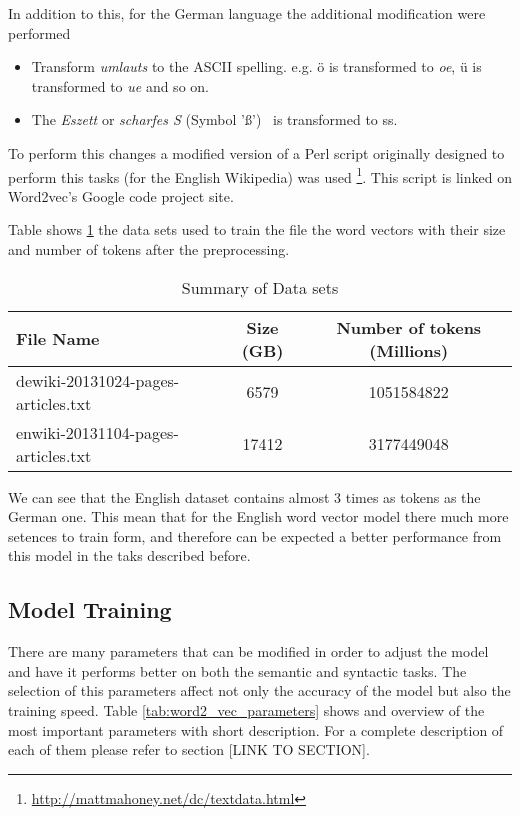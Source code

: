 In addition to this, for the German language the additional modification were
performed
\begin{itemize}
\item Transform \textit{umlauts} to the ASCII spelling.  e.g. \"{o} is
  transformed to \textit{oe},  \"{u} is transformed to \textit{ue}  and so
  on. 
\item The \textit{Eszett} or \textit{scharfes S} (Symbol '\ss') \  is transformed to ss.
\end{itemize}


To perform this changes a modified version of a Perl script originally
designed to perform this tasks (for the English Wikipedia) was used
\footnote{\url{http://mattmahoney.net/dc/textdata.html}}. This script is
linked on Word2vec's Google code project site.

Table shows \ref{tab:summ_dataset_germanword2vec} the data sets used
to train the file the word vectors with their size and number of tokens after
the preprocessing. 
  

 \begin{table}[h]

   \centering
   
   \caption{Summary of Data sets} 
   \label{tab:summ_dataset_germanword2vec}
   \small
   \begin{tabular}{ |l|c|c| }
   \hline           
    File Name &  Size (GB) & Number of tokens (Millions) \\  \hline           
    dewiki-20131024-pages-articles.txt & 6579 &   1051584822 \\ 
    enwiki-20131104-pages-articles.txt & 17412 &  3177449048  \\
    \hline

\end{tabular}
\end{table}

  

We can see that the English dataset contains almost 3 times as tokens as the
German one. This mean that for the English word vector model  there much more
setences to train form, and therefore can be expected a better performance
from this model in the taks described before. 
   
\subsection{Model Training}
\label{experiments:sub:Training}

There are many parameters that can be modified in order to adjust the model
and have it performs better on both the  semantic and syntactic tasks. The
selection of this parameters affect not only the accuracy of the model but
also the training speed.  Table \ref{tab:word2_vec_parameters} shows and
overview of the most important parameters with short description. For a
complete description of each of them please refer to section [LINK TO SECTION]. 


